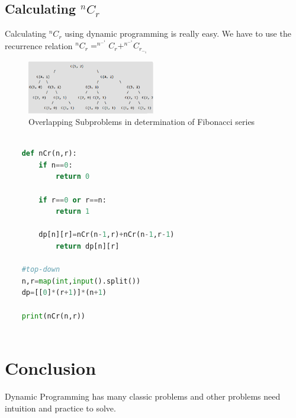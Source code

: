 \documentclass[12pt]{article}
\begin{document}
\subsection{Calculating $^nC_r$}
Calculating $^nC_r$ using dynamic programming is really easy. We have to use the recurrence relation  $^nC_r=^n^-^1C_r+^n^-^1C_r_-_1$

\begin{figure}[H]
	\centering
	
	\captionsetup{justification=centering}
	\includegraphics[width = 0.5\textwidth]{image/ncr.png}
	\caption{
		Overlapping Subproblems in determination of Fibonacci series
	}
	
\end{figure}

\begin{lstlisting}[language=python]
	
	def nCr(n,r):
		if n==0:
			return 0
		
		if r==0 or r==n:
			return 1
		
		dp[n][r]=nCr(n-1,r)+nCr(n-1,r-1)
			return dp[n][r]
	
	#top-down
	n,r=map(int,input().split())
	dp=[[0]*(r+1)]*(n+1)
	
	print(nCr(n,r))
	
\end{lstlisting}

\section{Conclusion}
Dynamic Programming has many classic problems and other problems need intuition and practice to solve.
\end{document}
